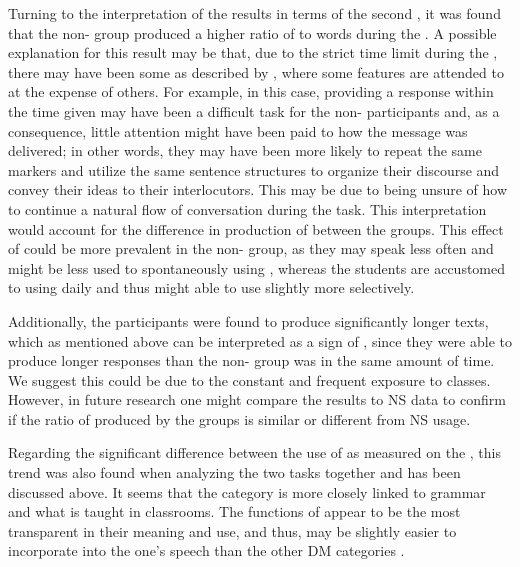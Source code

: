 \documentclass[output=paper]{langsci/langscibook}
\begin{document}
Turning to the interpretation of the results in terms of  the second , it was found that the non- group produced a higher ratio of  to words during the . A possible explanation for this result may be that, due to the strict time limit during the , there may have been some  as described by \citet{Skehan1998}, where some features are attended to at the expense of others. For example, in this case, providing a response within the time given may have been a difficult task for the non- participants and, as a consequence, little attention might have been paid to how the message was delivered; in other words, they may have been more likely to repeat the same markers and utilize the same sentence structures to organize their discourse and convey their ideas to their interlocutors. This may be due to being unsure of how to continue a natural flow of conversation during the task. This interpretation would account for the difference in production of  between the groups. This effect of  could be more prevalent in the non- group, as they may speak  less often and might be less used to spontaneously using , whereas the  students are accustomed to using  daily and thus might able to use  slightly more selectively.

Additionally, the  participants were found to produce significantly longer texts, which as mentioned above can be interpreted as a sign of , since they were able to produce longer responses than the non- group was in the same amount of time. We suggest this could be due to the constant and frequent exposure to  classes. However, in future research one might compare the results to NS data to confirm if the ratio of  produced by the groups is similar or different from NS usage. 

  
Regarding the significant difference between the use of   as measured on the , this trend was also found when analyzing the two tasks together and has been discussed above. It seems that the  category is more closely linked to grammar and what is taught in  classrooms. The functions of   appear to be the most transparent in their meaning and use, and thus, may be slightly easier to incorporate into the one’s speech than the other DM categories \citep{Liu2016}.
\end{document}
